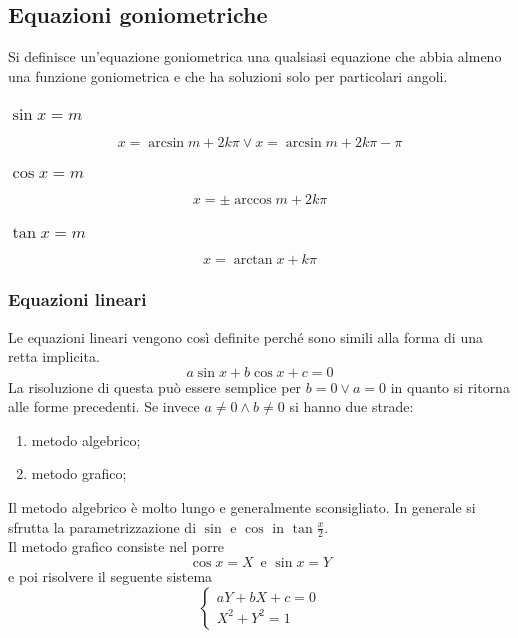 \subsection{Equazioni goniometriche}
Si definisce un'equazione goniometrica una qualsiasi equazione che abbia almeno una funzione 
goniometrica e che ha soluzioni solo per particolari angoli.
\subsubsection{$\sin x = m$}
\begin{equation*}
  x = \arcsin m + 2k\pi \lor  x = \arcsin m +2k\pi-\pi
\end{equation*}

\subsubsection{$\cos x = m$}
\begin{equation*}
  x = \pm\arccos m + 2k\pi
\end{equation*}

\subsubsection{$\tan x = m$}
\begin{equation*}
  x = \arctan x + k\pi
\end{equation*}

\subsubsection{Equazioni lineari}
Le equazioni lineari vengono così definite perché sono simili alla forma di una retta implicita.
\begin{equation*}
  a\sin x + b\cos x + c = 0
\end{equation*}
La risoluzione di questa può essere semplice per $b = 0 \lor a = 0$ in quanto si ritorna alle forme 
precedenti. Se invece $a\neq0 \land b\neq0$ si hanno due strade:
\begin{enumerate}
  \item metodo algebrico;
  \item metodo grafico;
\end{enumerate}
Il metodo algebrico è molto lungo e generalmente sconsigliato. In generale si sfrutta la 
parametrizzazione di $\sin$ e $\cos$ in $\tan \frac{x}{2}$.\\
Il metodo grafico consiste nel porre
\begin{equation*}
  \cos x = X\,\text{ e } \sin x = Y
\end{equation*}
e poi risolvere il seguente sistema
\begin{equation*}
  \begin{cases}
    aY + bX + c = 0\\
    X^2 + Y^2 = 1
  \end{cases}
\end{equation*}


